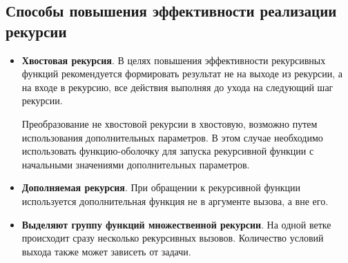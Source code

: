 \documentclass[a4paper,oneside,12pt]{extreport}
\begin{document}
\subsection*{Способы повышения эффективности реализации рекурсии}

\begin{itemize}
	\item {\bfseries Хвостовая рекурсия}.
	В целях повышения эффективности рекурсивных функций рекомендуется формировать результат не на выходе из рекурсии, а на входе в рекурсию, все действия выполняя до ухода на следующий шаг рекурсии.

	Преобразование не хвостовой рекурсии в хвостовую, возможно путем использования дополнительных параметров.
	В этом случае необходимо использовать функцию-оболочку для запуска рекурсивной функции с начальными значениями дополнительных параметров.

	\item {\bfseries Дополняемая рекурсия}.
	При обращении к рекурсивной функции используется дополнительная функция не в аргументе вызова, а вне его.

	\item {\bfseries Выделяют группу функций множественной рекурсии}.
	На одной ветке происходит сразу несколько рекурсивных вызовов.
	Количество условий выхода также может зависеть от задачи.
\end{itemize}
\end{document}
